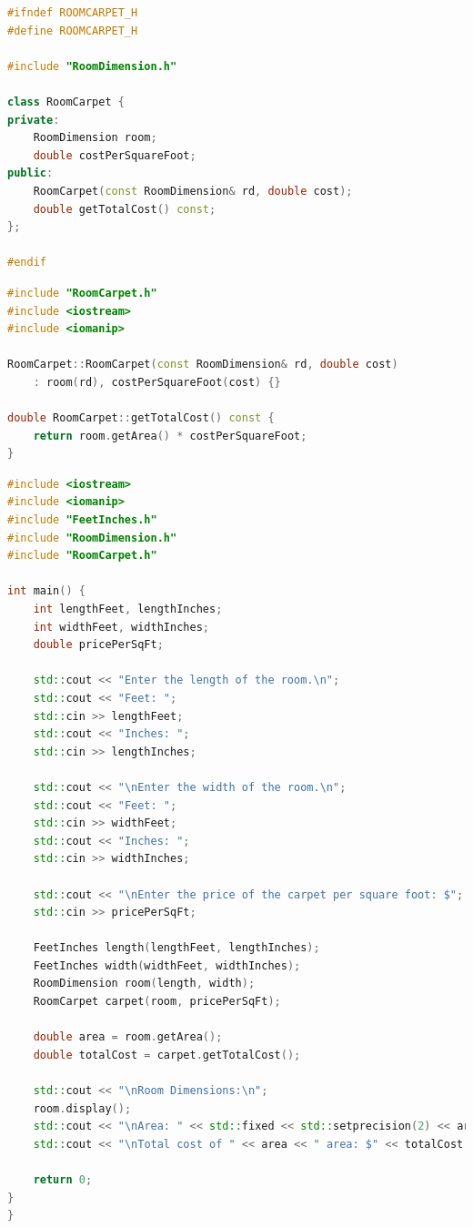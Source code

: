 \documentclass{article}
\begin{document}
\begin{lstlisting}[language=C++, caption={RoomCarpet.h}]
#ifndef ROOMCARPET_H
#define ROOMCARPET_H

#include "RoomDimension.h"

class RoomCarpet {
private:
    RoomDimension room;
    double costPerSquareFoot;
public:
    RoomCarpet(const RoomDimension& rd, double cost);
    double getTotalCost() const;
};

#endif
\end{lstlisting}

\begin{lstlisting}[language=C++, caption={RoomCarpet.cpp}]
#include "RoomCarpet.h"
#include <iostream>
#include <iomanip>

RoomCarpet::RoomCarpet(const RoomDimension& rd, double cost)
    : room(rd), costPerSquareFoot(cost) {}

double RoomCarpet::getTotalCost() const {
    return room.getArea() * costPerSquareFoot;
}
\end{lstlisting}

\begin{lstlisting}[language=C++, caption={main.cpp}]
#include <iostream>
#include <iomanip>
#include "FeetInches.h"
#include "RoomDimension.h"
#include "RoomCarpet.h"

int main() {
    int lengthFeet, lengthInches;
    int widthFeet, widthInches;
    double pricePerSqFt;

    std::cout << "Enter the length of the room.\n";
    std::cout << "Feet: ";
    std::cin >> lengthFeet;
    std::cout << "Inches: ";
    std::cin >> lengthInches;

    std::cout << "\nEnter the width of the room.\n";
    std::cout << "Feet: ";
    std::cin >> widthFeet;
    std::cout << "Inches: ";
    std::cin >> widthInches;

    std::cout << "\nEnter the price of the carpet per square foot: $";
    std::cin >> pricePerSqFt;

    FeetInches length(lengthFeet, lengthInches);
    FeetInches width(widthFeet, widthInches);
    RoomDimension room(length, width);
    RoomCarpet carpet(room, pricePerSqFt);

    double area = room.getArea();
    double totalCost = carpet.getTotalCost();

    std::cout << "\nRoom Dimensions:\n";
    room.display();
    std::cout << "\nArea: " << std::fixed << std::setprecision(2) << area << " square feet";
    std::cout << "\nTotal cost of " << area << " area: $" << totalCost << "\n";

    return 0;
}
}
\end{lstlisting}
\end{document}
